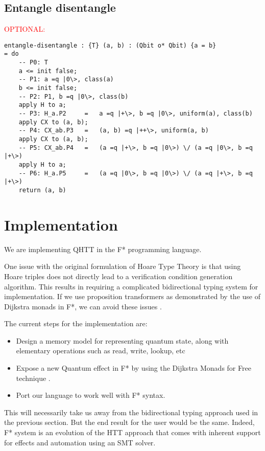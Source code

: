 \documentclass[acmsmall,nonacm,timestamp,review=false,anonymous=false]{acmart}
\newcommand{\todo}[1]{\textcolor{red}{#1}}
\begin{document}
\subsection{Entangle disentangle}
\todo{OPTIONAL:}

\begin{lstlisting}[language=QHaskell]
entangle-disentangle : {T} (a, b) : (Qbit o* Qbit) {a = b}
= do
    -- P0: T
    a <= init false;
    -- P1: a =q |0\>, class(a)
    b <= init false;
    -- P2: P1, b =q |0\>, class(b)
    apply H to a;
    -- P3: H_a.P2     =   a =q |+\>, b =q |0\>, uniform(a), class(b)
    apply CX to (a, b);
    -- P4: CX_ab.P3   =   (a, b) =q |++\>, uniform(a, b)
    apply CX to (a, b);
    -- P5: CX_ab.P4   =   (a =q |+\>, b =q |0\>) \/ (a =q |0\>, b =q |+\>)
    apply H to a;
    -- P6: H_a.P5     =   (a =q |0\>, b =q |0\>) \/ (a =q |+\>, b =q |+\>)
    return (a, b)
\end{lstlisting}

\section{Implementation}
We are implementing QHTT in the F* programming language.

One issue with the original formulation of Hoare Type Theory is that using Hoare triples does not directly lead to a verification condition generation algorithm. This results in requiring a complicated bidirectional typing system for implementation. If we use proposition transformers as demonstrated by the use of Dijkstra monads in F*, we can avoid these issues \cite{swamy2013verifying}.

The current steps for the implementation are:

\begin{itemize}
	\item Design a memory model for representing quantum state, along with elementary operations such as read, write, lookup, etc
	\item Expose a new Quantum effect in F* by using the Dijkstra Monads for Free technique \cite{dm4free2017}.
	\item Port our language to work well with F* syntax.
\end{itemize}

This will necessarily take us away from the bidirectional typing approach used in the previous section. But the end result for the user would be the same. Indeed, F* system is an evolution of the HTT approach that comes with inherent support for effects and automation using an SMT solver.
\end{document}
